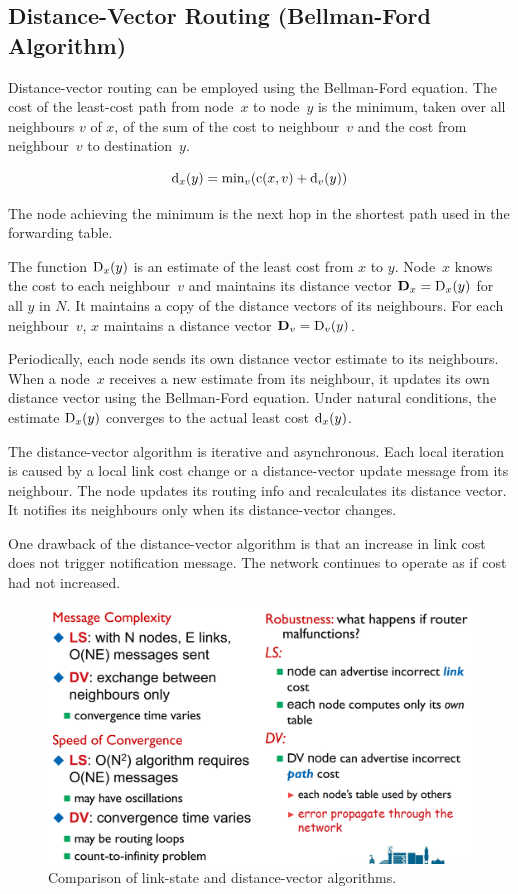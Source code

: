\subsection{Distance-Vector Routing (Bellman-Ford Algorithm)}

Distance-vector routing can be employed using the Bellman-Ford equation.
The cost of the least-cost path from node~\(x\) to node~\(y\) is the minimum, taken over all neighbours \(v\) of \(x\), of the sum of the cost to neighbour~\(v\) and the cost from neighbour~\(v\) to destination~\(y\).

\begin{equation*}
  \textup{d}_{x}\!\left( y \right) = \textup{min}_{v}\!\left( \textup{c}\!\left( x, v \right) + \textup{d}_{v}\!\left( y \right) \right)
\end{equation*}

The node achieving the minimum is the next hop in the shortest path used in the forwarding table.

The function \(\textup{D}_{x}\!\left( y \right)\) is an estimate of the least cost from \(x\) to \(y\).
Node~\(x\) knows the cost to each neighbour~\(v\) and maintains its distance vector \(\mathbf{D}_x = \textup{D}_{x}\!\left( y \right)\) for all \(y\) in \(N\).
It maintains a copy of the distance vectors of its neighbours.
For each neighbour~\(v\), \(x\) maintains a distance vector \(\mathbf{D}_v = \textup{D}_{v}\!\left( y \right)\).

Periodically, each node sends its own distance vector estimate to its neighbours.
When a node~\(x\) receives a new estimate from its neighbour, it updates its own distance vector using the Bellman-Ford equation.
Under natural conditions, the estimate \(\textup{D}_{x}\!\left( y \right)\) converges to the actual least cost \(\textup{d}_{x}\!\left( y \right)\).

The distance-vector algorithm is iterative and asynchronous.
Each local iteration is caused by a local link cost change or a distance-vector update message from its neighbour.
The node updates its routing info and recalculates its distance vector.
It notifies its neighbours only when its distance-vector changes.

One drawback of the distance-vector algorithm is that an increase in link cost does not trigger notification message.
The network continues to operate as if cost had not increased.

\begin{figure}[htp]
  \centering
  \includegraphics[width=12cm]{unit-19/figures/routing-algorithms.png}
  \caption*{Comparison of link-state and distance-vector algorithms.}
\end{figure}

